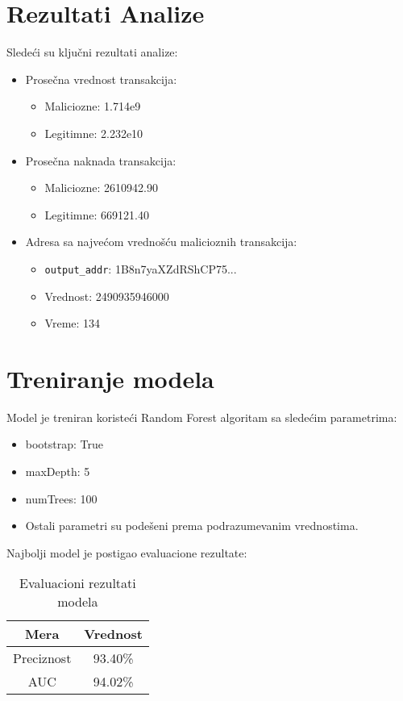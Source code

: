 \documentclass{article}
\begin{document}
\section{Rezultati Analize}
Sledeći su ključni rezultati analize:
\begin{itemize}
    \item Prosečna vrednost transakcija:
    \begin{itemize}
        \item Maliciozne: 1.714e9
        \item Legitimne: 2.232e10
    \end{itemize}
    \item Prosečna naknada transakcija:
    \begin{itemize}
        \item Maliciozne: 2610942.90
        \item Legitimne: 669121.40
    \end{itemize}
    \item Adresa sa najvećom vrednošću malicioznih transakcija:
    \begin{itemize}
        \item \texttt{output\_addr}: 1B8n7yaXZdRShCP75...
        \item Vrednost: 2490935946000
        \item Vreme: 134
    \end{itemize}
\end{itemize}

\section{Treniranje modela}

Model je treniran koristeći Random Forest algoritam sa sledećim parametrima:

\begin{itemize}
    \item bootstrap: True
    \item maxDepth: 5
    \item numTrees: 100
    \item Ostali parametri su podešeni prema podrazumevanim vrednostima.
\end{itemize}

Najbolji model je postigao evaluacione rezultate:

\begin{table}[h!]
    \centering
    \begin{tabular}{|c|c|}
        \hline
        \textbf{Mera} & \textbf{Vrednost} \\
        \hline
        Preciznost & 93.40\% \\
        AUC & 94.02\% \\
        \hline
    \end{tabular}
    \caption{Evaluacioni rezultati modela}
    \label{tab:evaluation}
\end{table}
\end{document}
